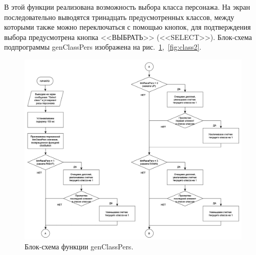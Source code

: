 В этой функции реализована возможность выбора класса персонажа. На экран последовательно выводятся тринадцать предусмотренных классов, между которыми также можно переключаться с помощью кнопок, для подтверждения выбора предусмотрена кнопка <<ВЫБРАТЬ>> (<<SELECT>>). Блок-схема подпрограммы genClassPers изображена на рис.~\ref{fig:class1},~\ref{fig:class2}.

\begin{figure}[H]
    \centering
    \includegraphics[scale=0.75]{genClassPers1.png}
    \caption{Блок-схема функции genClassPers.}
    \label{fig:class1}
\end{figure}

